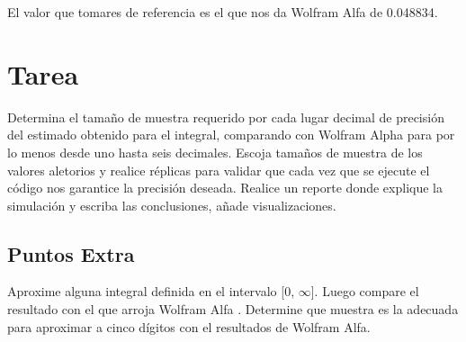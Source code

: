 \newpage
El valor que tomares de referencia es el que nos da Wolfram Alfa\cite{wolframalfa} de 0.048834.

\section{Tarea} \label{sec:tarea}

Determina el tamaño de muestra requerido por cada lugar decimal de precisión del estimado obtenido para el integral, comparando con Wolfram Alpha para por lo menos desde uno hasta seis decimales. Escoja tamaños de muestra de los valores aletorios y realice réplicas para validar que cada vez que se ejecute el código nos garantice la precisión deseada. Realice un reporte donde explique la simulación y escriba las conclusiones, añade visualizaciones.

\subsection{Puntos Extra}

Aproxime alguna integral definida en el intervalo [0, $\infty$]. Luego compare el resultado con el que arroja Wolfram Alfa \cite{wolframalfa}. Determine que muestra es la adecuada para aproximar a cinco dígitos con el resultados de Wolfram Alfa.




